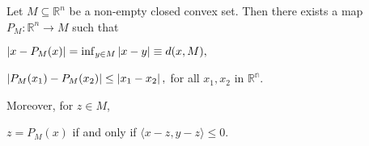 \begin{proposition}
    Let $M \subseteq \mathbb{R}^{n}$ be a non-empty closed convex set. Then there 
    exists a map $P_{M} : \mathbb{R}^{n} \to M$ such that
    \begin{asparaenum}[i)]
        \item
            $ \left\lvert x - P_{M}(x)\right\rvert = \inf_{y \in M}\left\lvert x-y\right\rvert \equiv d(x,M), $
        \item 
            $\left\lvert P_{M}(x_1) - P_M(x_2)\right\rvert \leq \left\lvert x_1 - x_2\right\rvert,$ for all 
            $x_1, x_2$ in $ \mathbb{R^{n}}$.
    \end{asparaenum}
    Moreover, for $z \in M$, 
    \begin{asparaenum}[iii)]
        \item $z = P_{M}(x)$ if and only if $\langle x-z, y-z \rangle \leq 0$.
    \end{asparaenum}
\end{proposition}
